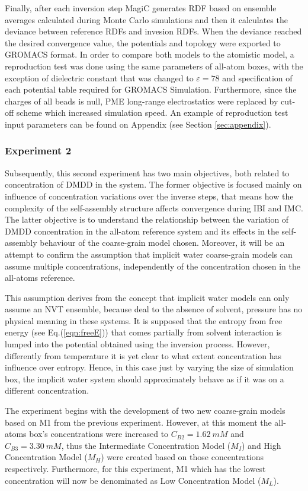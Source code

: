 \documentclass[10pt,a4paper,twoside]{article}
\begin{document}
 Finally, after each inversion step MagiC generates RDF based on ensemble averages calculated during Monte Carlo simulations and then it calculates the deviance between reference RDFs and invesion RDFs. When the deviance reached the desired convergence value, the potentials and topology were exported to GROMACS format. In order to compare both models to the atomistic model, a reproduction test was done using the same parameters of all-atom boxes, with the exception of dielectric constant that was changed to $\varepsilon = 78$ and specification of each potential table required for GROMACS Simulation. Furthermore, since the charges of all beads is null, PME long-range electrostatics were replaced by cut-off scheme which increased simulation speed. An example of reproduction test input parameters can be found on Appendix (see Section \ref{sec:appendix}).

\subsubsection*{Experiment 2}
 Subsequently, this second experiment has two main objectives, both related to concentration of DMDD in the system. The former objective is focused mainly on influence of concentration variations over the inverse steps, that means how the complexity of the self-assembly 
 structure affects convergence during IBI and IMC. The latter objective is to understand the relationship between the variation of DMDD concentration in the all-atom reference system and its effects in the self-assembly behaviour of the coarse-grain model chosen. Moreover, it will be an attempt to confirm the assumption that implicit water coarse-grain models can assume multiple concentrations, independently of the concentration chosen in the all-atoms reference.
 
 This assumption derives from the concept that implicit water models can only assume an NVT ensemble, because deal to the absence of solvent, pressure has no physical meaning in these systems. It is supposed that the entropy from free energy (see Eq.(\ref{eqn:freeE})) that comes partially from solvent interaction is lumped into the potential obtained using the inversion process. However,   differently from temperature it is yet clear to what extent concentration has influence over entropy. Hence, in this case just by varying the size of simulation box, the implicit water system should approximately behave as if it was on a different concentration.
  
 The experiment begins with the development of two new coarse-grain models based on M1 from the previous experiment. However, at this moment the all-atoms box's concentrations were increased to $C_{B2} = 1.62\ mM$ and $C_{B3} = 3.30\ mM$, thus the Intermediate Concentration Model ($M_{I}$) and High Concentration Model ($M_{H}$) were created based on those concentrations respectively. Furthermore, for this experiment, M1 which has the lowest concentration will now be denominated as Low Concentration Model ($M_{L}$).
 
\end{document}
